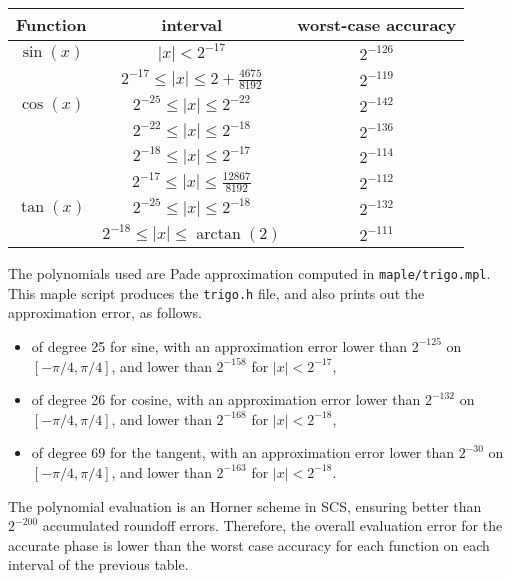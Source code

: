 \begin{center}
  \begin{tabular}{|c|c|c|}
    \hline
    Function & interval & worst-case accuracy \\
    \hline
    \hline
       $\sin(x)$ &  $|x|< 2^{-17}$                            & $2^{-126}$      \\
                 &  $ 2^{-17} \le |x| \le 2+\frac{4675}{8192}$& $2^{-119}$     \\
    \hline
       $\cos(x)$ &  $2^{-25} \le |x| \le 2^{-22}$            & $2^{-142}$       \\
                 &  $2^{-22} \le |x| \le 2^{-18}$            & $2^{-136}$       \\
                 &  $2^{-18} \le |x| \le 2^{-17}$            & $2^{-114}$       \\
                 &  $2^{-17} \le |x| \le \frac{12867}{8192}$ & $2^{-112}$       \\
    \hline
       $\tan(x)$ &  $2^{-25} \le |x| \le 2^{-18}$            & $2^{-132}$       \\
                 &  $2^{-18} \le |x| \le \arctan(2)$         & $2^{-111}$       \\
    \hline
  \end{tabular}
\end{center}

The polynomials used are Pade approximation computed in
\texttt{maple/trigo.mpl}. This maple script produces the \texttt{trigo.h} file, and also prints out the
approximation error, as follows.
\begin{itemize}
\item of degree 25 for sine, with an approximation error
  lower than $2^{-125}$ on $[-\pi/4, \pi/4]$, and lower than
  $2^{-158}$ for $|x|< 2^{-17}$,

\item of degree 26 for cosine, with an approximation error
  lower than $2^{-132}$ on $[-\pi/4, \pi/4]$, and lower than
  $2^{-168}$ for $|x|< 2^{-18}$,

\item of degree 69 for the tangent, with an approximation error lower
  than $2^{-30}$ on $[-\pi/4, \pi/4]$, and lower than
  $2^{-163}$ for $|x|< 2^{-18}$.
\end{itemize}

The polynomial evaluation is an Horner scheme in SCS, ensuring better
than $2^{-200}$ accumulated roundoff errors. Therefore, the overall
evaluation error for the accurate phase is lower than the worst case accuracy for
each function on each interval of the previous table.

